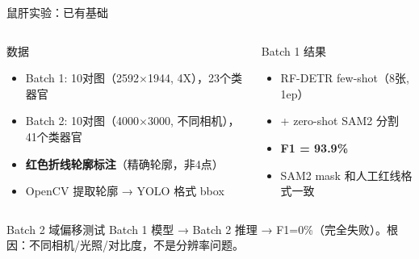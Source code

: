 \documentclass[aspectratio=169, 10pt]{beamer}
\begin{document}
\begin{frame}{鼠肝实验：已有基础}
  \begin{columns}[T]
    \begin{block}{数据}
      \begin{itemize}
        \item Batch 1: 10对图（2592$\times$1944, 4X），23个类器官
        \item Batch 2: 10对图（4000$\times$3000, 不同相机），41个类器官
        \item \textbf{红色折线轮廓标注}（精确轮廓，非4点）
        \item OpenCV 提取轮廓 → YOLO 格式 bbox
      \end{itemize}
    \end{block}
    \begin{block}{Batch 1 结果}
      \begin{itemize}
        \item RF-DETR few-shot（8张, 1ep）
        \item + zero-shot SAM2 分割
        \item \textbf{F1 = 93.9\%}
        \item SAM2 mask 和人工红线格式一致
      \end{itemize}
    \end{block}
  \end{columns}
  \vspace{0em}
  \begin{alertblock}{Batch 2 域偏移测试}
    Batch 1 模型 → Batch 2 推理 → F1=0\%（完全失败）。根因：不同相机/光照/对比度，不是分辨率问题。
  \end{alertblock}
\end{frame}
\end{document}
